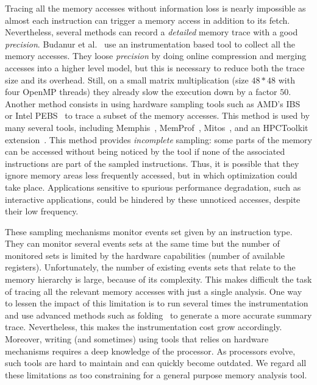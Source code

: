 Tracing all the memory accesses without information loss is nearly impossible as almost each instruction can trigger a memory access in addition to its fetch.
Nevertheless, several methods can record a \emph{detailed} memory trace with a good \emph{precision}.
Budanur et al.~\cite{Budanur11Memory} use an instrumentation based tool to collect all the memory accesses.
They loose \emph{precision} by doing online compression and merging accesses into a higher level model, but this is necessary to reduce both the trace size and its overhead.
Still, on a small matrix multiplication (size $48*48$ with four \gls{OpenMP} threads) they already slow the execution down by a factor $50$.
Another method consists in using hardware sampling tools such as AMD's \gls{IBS}~\cite{Drongowski07Instructionbased} or Intel \gls{PEBS}~\cite{Levinthal09Performance} to trace a subset of the memory accesses.
This method is used by many several tools, including \gls{Memphis}~\cite{McCurdy10Memphis}, \gls{MemProf}~\cite{Lachaize12MemProf}, \gls{Mitos}~\cite{Gimenez14Dissecting}, and an \gls{HPCToolkit} extension~\cite{Liu14Tool}.
This method provides \emph{incomplete} sampling: some parts of the memory can be accessed without being noticed by the tool if none of the associated instructions are part of the sampled instructions.
Thus, it is possible that they ignore memory areas less frequently accessed, but in which optimization could take place.
Applications sensitive to spurious performance degradation, such as interactive applications, could be hindered by these unnoticed accesses, despite their low frequency.

These sampling mechanisms monitor events set given by an instruction type.
They can monitor several events sets at the same time but the number of monitored sets is limited by the hardware capabilities (number of available registers).
Unfortunately, the number of existing events sets that relate to the memory hierarchy is large, because of its complexity.
This makes difficult the task of tracing all the relevant memory accesses with just a single analysis.
One way to lessen the impact of this limitation is to run several times the instrumentation and use advanced methods such as folding~\cite{Servat15Towards} to generate a more accurate summary trace.
Nevertheless, this makes the instrumentation cost grow accordingly.
Moreover, writing (and sometimes) using tools that relies on hardware mechanisms requires a deep knowledge of the processor.
As processors evolve, such tools are hard to maintain and can quickly become outdated.
We regard all these limitations as too constraining for a general purpose memory analysis tool.

